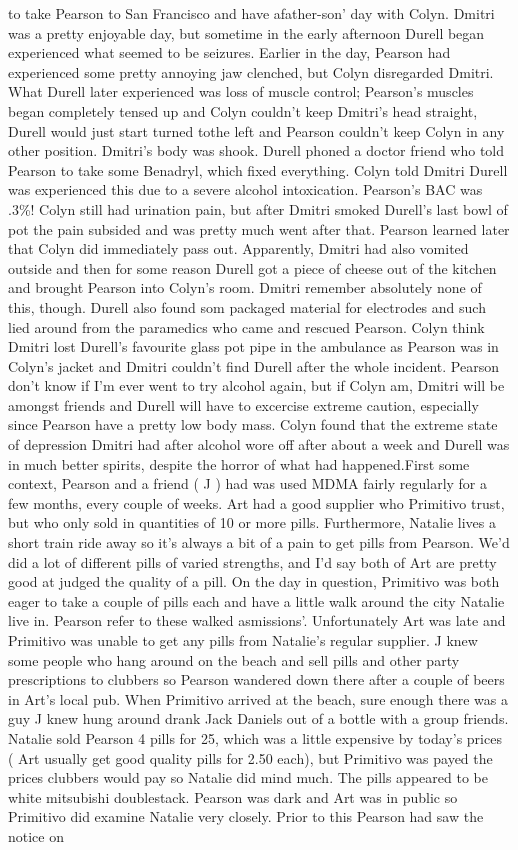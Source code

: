 \documentclass[12pt]{book}
\begin{document}
to take Pearson to San Francisco and have afather-son' day with Colyn. Dmitri was a pretty enjoyable day, but sometime in the early afternoon Durell began experienced what seemed to be seizures. Earlier in the day, Pearson had experienced some pretty annoying jaw clenched, but Colyn disregarded Dmitri. What Durell later experienced was loss of muscle control; Pearson's muscles began completely tensed up and Colyn couldn't keep Dmitri's head straight, Durell would just start turned tothe left and Pearson couldn't keep Colyn in any other position. Dmitri's body was shook. Durell phoned a doctor friend who told Pearson to take some Benadryl, which fixed everything. Colyn told Dmitri Durell was experienced this due to a severe alcohol intoxication. Pearson's BAC was .3\%! Colyn still had urination pain, but after Dmitri smoked Durell's last bowl of pot the pain subsided and was pretty much went after that. Pearson learned later that Colyn did immediately pass out. Apparently, Dmitri had also vomited outside and then for some reason Durell got a piece of cheese out of the kitchen and brought Pearson into Colyn's room. Dmitri remember absolutely none of this, though. Durell also found som packaged material for electrodes and such lied around from the paramedics who came and rescued Pearson. Colyn think Dmitri lost Durell's favourite glass pot pipe in the ambulance as Pearson was in Colyn's jacket and Dmitri couldn't find Durell after the whole incident. Pearson don't know if I'm ever went to try alcohol again, but if Colyn am, Dmitri will be amongst friends and Durell will have to excercise extreme caution, especially since Pearson have a pretty low body mass. Colyn found that the extreme state of depression Dmitri had after alcohol wore off after about a week and Durell was in much better spirits, despite the horror of what had happened.First some context, Pearson and a friend ( J ) had was used MDMA fairly regularly for a few months, every couple of weeks. Art had a good supplier who Primitivo trust, but who only sold in quantities of 10 or more pills. Furthermore, Natalie lives a short train ride away so it's always a bit of a pain to get pills from Pearson. We'd did a lot of different pills of varied strengths, and I'd say both of Art are pretty good at judged the quality of a pill. On the day in question, Primitivo was both eager to take a couple of pills each and have a little walk around the city Natalie live in. Pearson refer to these walked asmissions'. Unfortunately Art was late and Primitivo was unable to get any pills from Natalie's regular supplier. J knew some people who hang around on the beach and sell pills and other party prescriptions to clubbers so Pearson wandered down there after a couple of beers in Art's local pub. When Primitivo arrived at the beach, sure enough there was a guy J knew hung around drank Jack Daniels out of a bottle with a group friends. Natalie sold Pearson 4 pills for 25, which was a little expensive by today's prices ( Art usually get good quality pills for 2.50 each), but Primitivo was payed the prices clubbers would pay so Natalie did mind much. The pills appeared to be white mitsubishi doublestack. Pearson was dark and Art was in public so Primitivo did examine Natalie very closely. Prior to this Pearson had saw the notice on 
\end{document}
